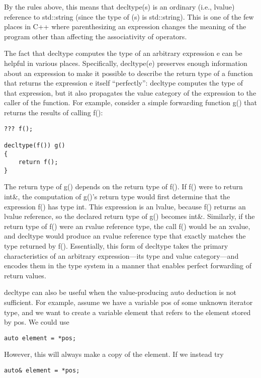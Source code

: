 By the rules above, this means that decltype(s) is an ordinary (i.e., lvalue) reference to std::string (since the type of (s) is std::string). This is one of the few places in C++ where parenthesizing an expression changes the meaning of the program other than affecting the associativity of operators.

The fact that decltype computes the type of an arbitrary expression e can be helpful in various places. Specifically, decltype(e) preserves enough information about an expression to make it possible to describe the return type of a function that returns the expression e itself “perfectly”: decltype computes the type of that expression, but it also propagates the value category of the expression to the caller of the function. For example, consider a simple forwarding function g() that returns the results of calling f():

\begin{lstlisting}[style=styleCXX]
??? f();

decltype(f()) g()
{
	return f();
}
\end{lstlisting}

The return type of g() depends on the return type of f(). If f() were to return int\&, the computation of g()’s return type would first determine that the expression f() has type int. This expression is an lvalue, because f() returns an lvalue reference, so the declared return type of g() becomes int\&. Similarly, if the return type of f() were an rvalue reference type, the call f() would be an xvalue, and decltype would produce an rvalue reference type that exactly matches the type returned by f(). Essentially, this form of decltype takes the primary characteristics of an arbitrary expression—its type and value category—and encodes them in the type system in a manner that enables perfect forwarding of return values.

decltype can also be useful when the value-producing auto deduction is not sufficient. For example, assume we have a variable pos of some unknown iterator type, and we want to create a variable element that refers to the element stored by pos. We could use

\begin{lstlisting}[style=styleCXX]
auto element = *pos;
\end{lstlisting}

However, this will always make a copy of the element. If we instead try

\begin{lstlisting}[style=styleCXX]
auto& element = *pos;
\end{lstlisting}

